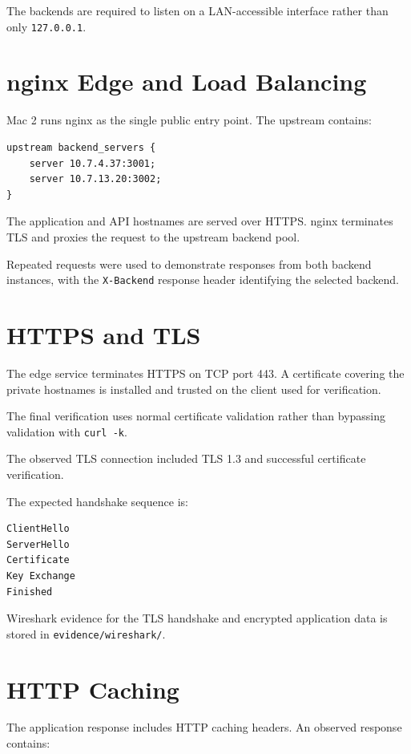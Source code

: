 \documentclass[11pt,a4paper]{article}
\begin{document}
The backends are required to listen on a LAN-accessible interface rather
than only \texttt{127.0.0.1}.

\section{nginx Edge and Load Balancing}

Mac 2 runs nginx as the single public entry point. The upstream contains:

\begin{lstlisting}
upstream backend_servers {
    server 10.7.4.37:3001;
    server 10.7.13.20:3002;
}
\end{lstlisting}

The application and API hostnames are served over HTTPS. nginx terminates
TLS and proxies the request to the upstream backend pool.

Repeated requests were used to demonstrate responses from both backend
instances, with the \texttt{X-Backend} response header identifying the
selected backend.

\section{HTTPS and TLS}

The edge service terminates HTTPS on TCP port 443. A certificate covering
the private hostnames is installed and trusted on the client used for
verification.

The final verification uses normal certificate validation rather than
bypassing validation with \texttt{curl -k}.

The observed TLS connection included TLS 1.3 and successful certificate
verification.

The expected handshake sequence is:

\begin{lstlisting}
ClientHello
ServerHello
Certificate
Key Exchange
Finished
\end{lstlisting}

Wireshark evidence for the TLS handshake and encrypted application data
is stored in \texttt{evidence/wireshark/}.

\section{HTTP Caching}

The application response includes HTTP caching headers. An observed
response contains:
\end{document}
